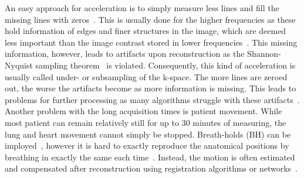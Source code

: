 An easy approach for acceleration is to simply measure less lines and fill the missing lines with zeros~\cite{DeepMRIReconstructionSubsampling}. This is usually done for the higher frequencies as these hold information of edges and finer structures in the image, which are deemed less important than the image contrast stored in lower frequencies~\cite{AdvancesPI}. This missing information, however, leads to artifacts upon reconstruction as the Shannon-Nyquist sampling theorem~\cite{Shannon} is violated. Consequently, this kind of acceleration is usually called under- or subsampling of the k-space. The more lines are zeroed out, the worse the artifacts become as more information is missing. This leads to problems for further processing as many algorithms struggle with these artifacts~\cite{DeepMRIReconstructionSubsampling}. \\
Another problem with the long acquisition times is patient movement. While most patient can remain relatively still for up to 30 minutes of measuring, the lung and heart movement cannot simply be stopped. Breath-holds (BH) can be imployed~\cite{Zaitsev2015}, however it is hard to exactly reproduce the anatomical positions by breathing in exactly the same each time~\cite{Lin2022}. Instead, the motion is often estimated and compensated after reconstruction using registration algorithms or networks~\cite{Kuestner2022,Chen2023,GRICS}.

